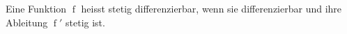 Eine Funktion $\operatorname{f}$ heisst stetig differenzierbar, wenn sie differenzierbar und ihre Ableitung $\operatorname{f}'$ stetig ist.
